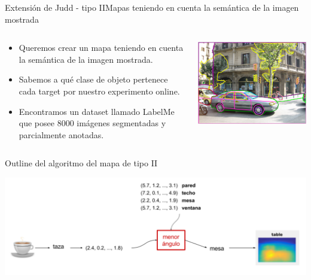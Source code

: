 \documentclass[compress]{beamer}
\begin{document}
\begin{frame}{Extensión de Judd - tipo II}{Mapas teniendo en cuenta la semántica de la imagen mostrada}

  \begin{columns}[T]
    \begin{column}{.65\textwidth}
        \begin{itemize}
            \item Queremos crear un mapa teniendo en cuenta la semántica de la imagen mostrada.
            \item Sabemos a qué clase de objeto pertenece cada target por nuestro experimento online. 
            \item Encontramos un dataset llamado LabelMe que posee 8000 imágenes segmentadas y parcialmente anotadas.
        \end{itemize}
    \end{column}
    \begin{column}{.35\textwidth}
        \vspace{0.5cm}
        \begin{center}
        \includegraphics[width=\textwidth]{images/label-me-example.png} 
        \end{center}
    \end{column}
  \end{columns}

\end{frame}

\begin{frame}{Outline del algoritmo del mapa de tipo II}

    \begin{center}
    \includegraphics[width=\textwidth]{images/mapa-tipo-ii.png} 
    \end{center}

\end{frame}
\end{document}
